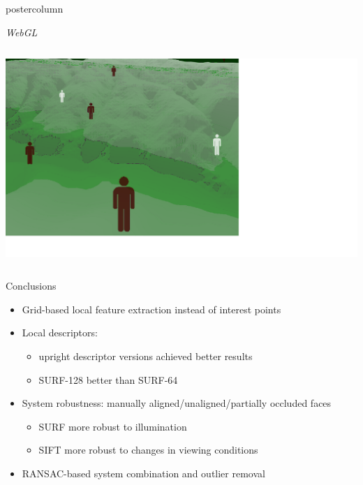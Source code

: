 \documentclass[final,hyperref={pdfpagelabels=false}]{beamer}
\begin{document}
\begin{frame}
\begin{columns}
\begin{column}{.33\textwidth}
\begin{beamercolorbox}[center,wd=\textwidth]{postercolumn}
\begin{minipage}[T]{.95\textwidth}
{\begin{block}{\textit{WebGL}}
\begin{columns}
\begin{column}{.99\textwidth}
                  \-
                  \includegraphics[width=0.88\linewidth]{images/fp3}
                \end{column}
              \end{columns}
            \end{block}
            \vfill
            \begin{block}{Conclusions}
              \begin{itemize}
              \item Grid-based local feature extraction instead of interest points
              \item Local descriptors:
                \begin{itemize}
                \item upright descriptor versions achieved better results
                \item SURF-128 better than SURF-64
                \end{itemize}
              \item System robustness: manually aligned/unaligned/partially occluded faces
                \begin{itemize}
                \item SURF more robust to illumination
                \item SIFT more robust to changes in viewing conditions
                \end{itemize}
              \item RANSAC-based system combination and outlier removal
              \end{itemize}
            \end{block}
          }
        \end{minipage}
      \end{beamercolorbox}

\end{column}
\end{columns}
\end{frame}
\end{document}
